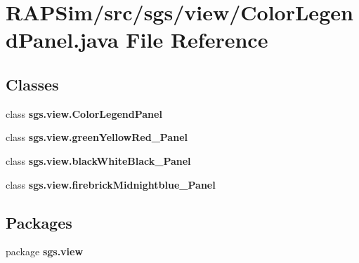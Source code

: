 \section{R\-A\-P\-Sim/src/sgs/view/\-Color\-Legend\-Panel.java File Reference}
\label{_color_legend_panel_8java}
\subsection*{Classes}
\begin{DoxyCompactItemize}
\item 
class {\bf sgs.\-view.\-Color\-Legend\-Panel}
\item 
class {\bfseries sgs.\-view.\-green\-Yellow\-Red\-\_\-\-Panel}
\item 
class {\bfseries sgs.\-view.\-black\-White\-Black\-\_\-\-Panel}
\item 
class {\bfseries sgs.\-view.\-firebrick\-Midnightblue\-\_\-\-Panel}
\end{DoxyCompactItemize}
\subsection*{Packages}
\begin{DoxyCompactItemize}
\item 
package {\bf sgs.\-view}
\end{DoxyCompactItemize}
